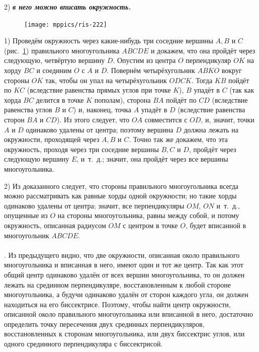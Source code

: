 \documentclass[twoside]{book}
\begin{document}
2) \textbf{\emph{в него можно вписать окружность.}}

\begin{figure}
\centering
\texttt{[image: mppics/ris-222]}
\caption{}\label{1938/ris-222}
\end{figure}

1) Проведём окружность через какие-нибудь три соседние вершины $A, B$ и $C$ (рис.~\ref{1938/ris-222}) правильного многоугольника $ABCDE$ и докажем, что она пройдёт через следующую, четвёртую вершину $D$.
Опустим из центра $O$ перпендикуляр $OK$ на хорду $BC$ и соединим $O$ с $A$ и $D$.
Повернём четырёхугольник $ABKO$ вокруг стороны $OK$ так, чтобы он упал на четырёхугольник $ODCK$.
Тогда $KB$ пойдёт по $KC$ (вследствие равенства прямых углов при точке $K$), 
$B$ упадёт в $C$ (так как хорда $BC$ делится в точке $K$ пополам), 
сторона $BA$ пойдёт по $CD$ (вследствие равенства углов $B$ и $C$)
и, наконец, точка $A$ упадёт в $D$ (вследствие равенства сторон $BA$ и $CD$).
Из этого следует, что $OA$ совместится с $OD$, и, значит, точки $A$ и $D$ одинаково удалены от центра;
поэтому вершина $D$ должна лежать на окружности, проходящей через $A, B$ и $C$.
Точно так же докажем, что эта окружность, проходя через три соседние вершины $B, C$ и $D$, пройдёт через следующую вершину $E$, и~т.~д.;
значит, она пройдёт через все вершины многоугольника.

2) Из доказанного следует, что стороны правильного многоугольника всегда можно рассматривать как равные хорды одной окружности;
но такие хорды одинаково удалены от центра;
значит, все перпендикуляры $OM$, $ON$ и~т.~д., опущенные из $O$ на стороны многоугольника, равны между собой, и потому окружность, описанная радиусом $OM$ с центром в точке $O$, будет вписанной в многоугольник $ABCDE$.

\paragraph{}\label{1938/216}
.
Из предыдущего видно, что две окружности, описанная около правильного многоугольника и вписанная в него, имеют один и тот же центр.
Так как этот общий центр одинаково удалён от всех вершин многоугольника, то он должен лежать на срединном перпендикуляре, восстановленным к любой стороне многоугольника, а будучи одинаково удалён от сторон каждого угла, он должен находиться на его биссектрисе.
Поэтому, чтобы найти центр окружности, описанной около правильного многоугольника или вписанной в него, достаточно определить точку пересечения двух срединных перпендикуляров, восстановленных к сторонам многоугольника, или двух биссектрис углов, или одного срединного перпендикуляра с биссектрисой.
\end{document}
